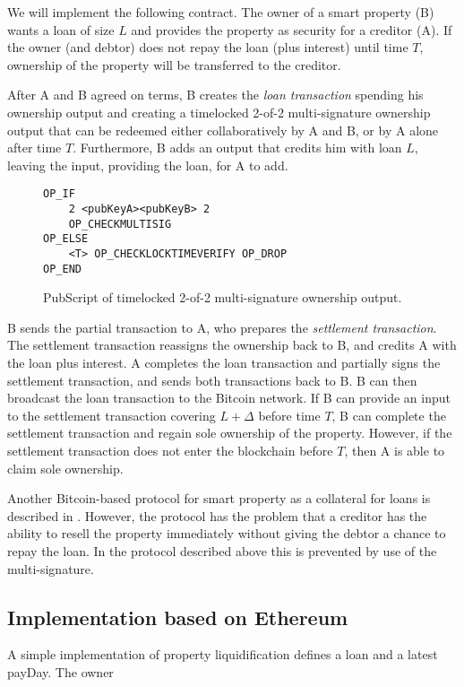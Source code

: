 We will implement the following contract. The owner of a smart property (B) wants a loan of size $L$ and provides the property as security for a creditor (A). If the owner (and debtor) does not repay the loan (plus interest) until time $T$, ownership of the property will be transferred to the creditor.

After A and B agreed on terms, B creates the \emph{loan transaction} spending his ownership output and creating a timelocked 2-of-2 multi-signature ownership output that can be redeemed either collaboratively by A and B, or by A alone after time $T$. Furthermore, B adds an output that credits him with loan $L$, leaving the input, providing the loan, for A to add. 
\begin{figure}
\begin{lstlisting}
OP_IF 
    2 <pubKeyA><pubKeyB> 2
    OP_CHECKMULTISIG
OP_ELSE
    <T> OP_CHECKLOCKTIMEVERIFY OP_DROP
OP_END    
\end{lstlisting}
\caption{PubScript of timelocked 2-of-2 multi-signature ownership output.}
\end{figure}

B sends the partial transaction to A, who prepares the \emph{settlement transaction}. The settlement transaction reassigns the ownership back to B, and credits A with the loan plus interest. A completes the loan transaction and partially signs the settlement transaction, and sends both transactions back to B. B can then broadcast the loan transaction to the Bitcoin network. 
If B can provide an input to the settlement transaction covering $L+\Delta$ before time $T$, B can complete the settlement transaction and regain sole ownership of the property. However, if the settlement transaction does not enter the blockchain before $T$, then A is able to claim sole ownership.

Another Bitcoin-based protocol for smart property as a collateral for loans is described in \cite{smartproperty2011}. However, the protocol has the problem that a creditor has the ability to resell the property immediately without giving the debtor a chance to repay the loan. In the protocol described above this is prevented by use of the multi-signature. 

\subsection{Implementation based on Ethereum}

A simple implementation of property liquidification defines a loan and a latest payDay. The owner  

